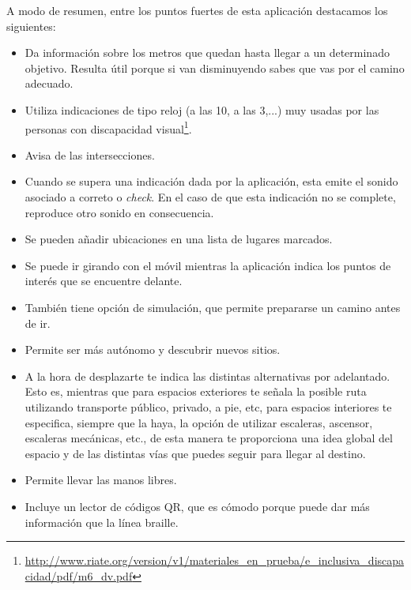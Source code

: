 A modo de resumen, entre los puntos fuertes de esta aplicación destacamos los siguientes:
\begin{itemize}
	\item Da información sobre los metros que quedan hasta llegar a un determinado objetivo. Resulta útil porque si van disminuyendo sabes que vas por el camino adecuado.
	
	\item Utiliza indicaciones de tipo reloj (a las 10, a las 3,...) muy usadas por las personas con discapacidad visual\footnote{\url{http://www.riate.org/version/v1/materiales_en_prueba/e_inclusiva_discapacidad/pdf/m6_dv.pdf}}.
	
	\item Avisa de las intersecciones. 
	
	\item Cuando se supera una indicación dada por la aplicación, esta emite el sonido asociado a correto o \textit{check}. En el caso de que esta indicación no se complete, reproduce otro sonido en consecuencia.
	
	\item Se pueden añadir ubicaciones en una lista de lugares marcados.
	
	\item Se puede ir girando con el móvil mientras la aplicación indica los puntos de interés que se encuentre delante. 
	
	\item También tiene opción de simulación, que permite prepararse un camino antes de ir.
	
	\item Permite ser más autónomo y descubrir nuevos sitios.
	
	\item A la hora de desplazarte te indica las distintas alternativas por adelantado. Esto es, mientras que para espacios exteriores te señala la posible ruta utilizando transporte público, privado, a pie, etc, para espacios interiores te especifica, siempre que la haya, la opción de utilizar escaleras, ascensor, escaleras mecánicas, etc., de esta manera te proporciona una idea global del espacio y de las distintas vías que puedes seguir para llegar al destino.
	
	\item Permite llevar las manos libres.
	
	\item Incluye un lector de códigos QR, que es cómodo porque puede dar más información que la línea braille.
\end{itemize}

